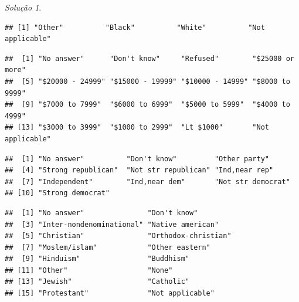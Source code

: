 \documentclass[
]{latex/krantz}
\newenvironment{Shaded}{\begin{snugshade}}{\end{snugshade}}
\newcommand{\FunctionTok}[1]{\textcolor[rgb]{0.13,0.29,0.53}{\textbf{#1}}}
\newcommand{\NormalTok}[1]{#1}
\newcommand{\SpecialCharTok}[1]{\textcolor[rgb]{0.81,0.36,0.00}{\textbf{#1}}}
\theoremstyle{definition}
\theoremstyle{definition}
\theoremstyle{definition}
\theoremstyle{definition}
\theoremstyle{remark}
\newtheorem*{solution}{Solução}
\begin{document}
\begin{solution}
\begin{verbatim}
## [1] "Other"          "Black"          "White"          "Not applicable"
\end{verbatim}

\begin{Shaded}
\end{Shaded}

\begin{verbatim}
##  [1] "No answer"      "Don't know"     "Refused"        "$25000 or more"
##  [5] "$20000 - 24999" "$15000 - 19999" "$10000 - 14999" "$8000 to 9999" 
##  [9] "$7000 to 7999"  "$6000 to 6999"  "$5000 to 5999"  "$4000 to 4999" 
## [13] "$3000 to 3999"  "$1000 to 2999"  "Lt $1000"       "Not applicable"
\end{verbatim}

\begin{Shaded}
\end{Shaded}

\begin{verbatim}
##  [1] "No answer"          "Don't know"         "Other party"       
##  [4] "Strong republican"  "Not str republican" "Ind,near rep"      
##  [7] "Independent"        "Ind,near dem"       "Not str democrat"  
## [10] "Strong democrat"
\end{verbatim}

\begin{Shaded}
\end{Shaded}

\begin{verbatim}
##  [1] "No answer"               "Don't know"             
##  [3] "Inter-nondenominational" "Native american"        
##  [5] "Christian"               "Orthodox-christian"     
##  [7] "Moslem/islam"            "Other eastern"          
##  [9] "Hinduism"                "Buddhism"               
## [11] "Other"                   "None"                   
## [13] "Jewish"                  "Catholic"               
## [15] "Protestant"              "Not applicable"
\end{verbatim}


\end{solution}
\end{document}
